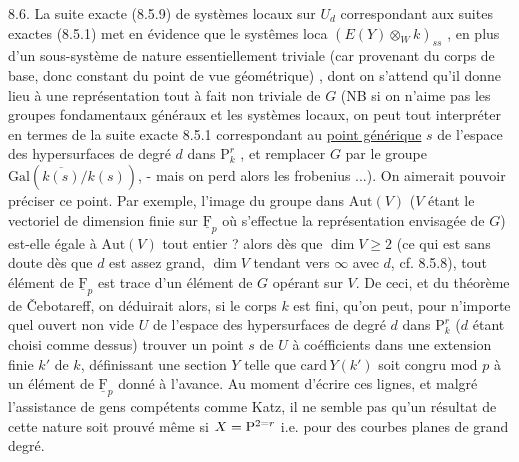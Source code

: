 %
8.6. La suite exacte (8.5.9) de systèmes locaux sur $U_d$ correspondant aux suites exactes (8.5.1) met en évidence que le systêmes loca   $(E(Y)\otimes_W k)_{ss}$ , en plus d'un sous-système   de nature essentiellement triviale (car provenant du corps de base, donc constant du point de vue géométrique)    , dont on s'attend qu'il donne lieu à une représentation tout à fait non triviale de $G$ (NB si on n'aime pas les groupes fondamentaux généraux et les systèmes locaux, on peut tout interpréter en termes de la suite exacte 8.5.1 correspondant au \uline{point générique} $s$ de l'espace des hypersurfaces de degré $d$ dans $\mathrm P^r_k$ , et remplacer $G$ par le groupe $\mathrm{Gal}(\overline{k(s)}/k(s))$, - mais on perd alors les frobenius ...). On aimerait pouvoir préciser ce point. Par exemple,  l'image du groupe   dans $\mathrm{Aut}(V)$ ($V$ étant le  vectoriel de dimension finie sur $\underline{\mathrm F}_p$ où s'effectue la représentation envisagée de $G$) est-elle égale à $\mathrm{Aut}(V)$ tout entier ?   alors dès que  $\dim V\geq2$ (ce qui est sans doute  dès que $d$ est assez grand, $\dim V$ tendant vers $\infty$ avec $d$, cf. 8.5.8), tout élément de $\underline{\mathrm F}_p$ est trace d'un élément de $G$ opérant sur $V$. De ceci,  et du théorème de Čebotareff, on déduirait alors, \handwritten{(}si le corps $k$ est fini\unsure{)}, qu'on peut, pour n'importe quel ouvert non vide $U$ de l'espace des hypersurfaces de degré $d$ dans $\mathrm P^r_k$ ($d$ étant choisi comme dessus) trouver un point  $s$ de $U$ à coéfficients dans une extension finie $k'$ de $k$, définissant une section $Y$ telle que $\mathrm{card}\,Y(k')$ soit congru mod $p$ à un élément de $\underline{\mathrm F}_p$ donné à l'avance. Au moment d'écrire ces lignes, et malgré l'assistance de gens compétents comme Katz, il ne semble pas qu'un résultat de cette nature soit prouvé\deleted{,}\handwritten{(} même si $X=\mathrm P^{2=r}$ i.e. pour des courbes planes  de grand degré\handwritten{)}. 

